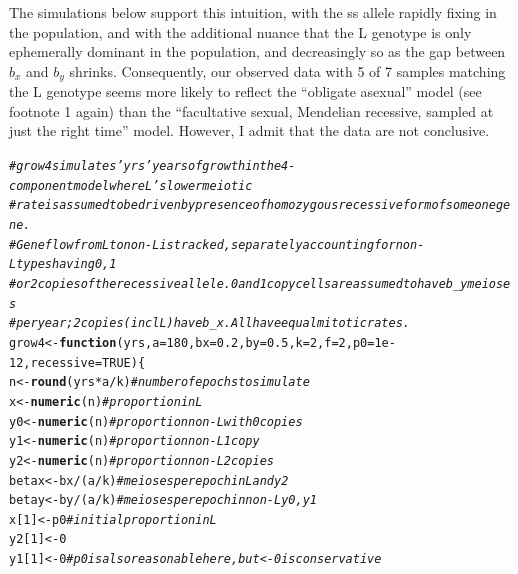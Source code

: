 \documentclass{article}\usepackage[]{graphicx}\usepackage[]{color}
\makeatletter
\newcommand{\hlnum}[1]{\textcolor[rgb]{0.686,0.059,0.569}{#1}}%
\newcommand{\hlcom}[1]{\textcolor[rgb]{0.678,0.584,0.686}{\textit{#1}}}%
\newcommand{\hlopt}[1]{\textcolor[rgb]{0,0,0}{#1}}%
\newcommand{\hlstd}[1]{\textcolor[rgb]{0.345,0.345,0.345}{#1}}%
\newcommand{\hlkwa}[1]{\textcolor[rgb]{0.161,0.373,0.58}{\textbf{#1}}}%
\newcommand{\hlkwb}[1]{\textcolor[rgb]{0.69,0.353,0.396}{#1}}%
\newcommand{\hlkwc}[1]{\textcolor[rgb]{0.333,0.667,0.333}{#1}}%
\newcommand{\hlkwd}[1]{\textcolor[rgb]{0.737,0.353,0.396}{\textbf{#1}}}%
\newenvironment{kframe}{%
 \def\at@end@of@kframe{}%
 \ifinner\ifhmode%
  \def\at@end@of@kframe{\end{minipage}}%
  \begin{minipage}{\columnwidth}%
 \fi\fi%
 \def\FrameCommand##1{\hskip\@totalleftmargin \hskip-\fboxsep
 \colorbox{shadecolor}{##1}\hskip-\fboxsep
     \hskip-\linewidth \hskip-\@totalleftmargin \hskip\columnwidth}%
 \MakeFramed {\advance\hsize-\width
   \@totalleftmargin\z@ \linewidth\hsize
   \@setminipage}}%
 {\par\unskip\endMakeFramed%
 \at@end@of@kframe}
\newenvironment{knitrout}{}{} %
\makeatother
\begin{document}
The simulations below support this intuition, with the ss allele rapidly fixing in the population,
and with the additional nuance that the L genotype is only ephemerally dominant in the population,
and decreasingly so as the gap between $b_x$ and $b_y$ shrinks.  Consequently, our observed data
with 5 of 7 samples matching the L genotype seems more likely to reflect the ``obligate asexual''
model (see footnote 1 again) than the ``facultative sexual, Mendelian recessive, sampled at just the
right time'' model.  However, I admit that the data are not conclusive.

\begin{knitrout}\footnotesize
{}\color{fgcolor}\begin{kframe}
\begin{alltt}
\hlcom{# grow4 simulates 'yrs' years of growth in the 4-component model where L's lower meiotic}
\hlcom{# rate is assumed to be driven by presence of homozygous recessive form of some one gene. }
\hlcom{# Gene flow from L to non-L is tracked, separately accounting for non-L types having 0, 1}
\hlcom{# or 2 copies of the recessive allele. 0 and 1 copy cells are assumed to have b_y meioses}
\hlcom{# per year; 2 copies (incl L) have b_x.  All have equal mitotic rates.}
\hlstd{grow4} \hlkwb{<-} \hlkwa{function}\hlstd{(}\hlkwc{yrs}\hlstd{,} \hlkwc{a}\hlstd{=}\hlnum{180}\hlstd{,} \hlkwc{bx}\hlstd{=}\hlnum{0.2}\hlstd{,} \hlkwc{by}\hlstd{=}\hlnum{0.5}\hlstd{,} \hlkwc{k}\hlstd{=}\hlnum{2}\hlstd{,} \hlkwc{f}\hlstd{=}\hlnum{2}\hlstd{,} \hlkwc{p0}\hlstd{=}\hlnum{1e-12}\hlstd{,} \hlkwc{recessive}\hlstd{=}\hlnum{TRUE}\hlstd{)\{}
  \hlstd{n} \hlkwb{<-} \hlkwd{round}\hlstd{(yrs}\hlopt{*}\hlstd{a}\hlopt{/}\hlstd{k)} \hlcom{# number of epochs to simulate}
  \hlstd{x} \hlkwb{<-} \hlkwd{numeric}\hlstd{(n)}     \hlcom{# proportion in L}
  \hlstd{y0}\hlkwb{<-} \hlkwd{numeric}\hlstd{(n)}     \hlcom{# proportion non-L with 0 copies}
  \hlstd{y1}\hlkwb{<-} \hlkwd{numeric}\hlstd{(n)}     \hlcom{# proportion non-L 1 copy}
  \hlstd{y2}\hlkwb{<-} \hlkwd{numeric}\hlstd{(n)}     \hlcom{# proportion non-L 2 copies}
  \hlstd{betax} \hlkwb{<-} \hlstd{bx}\hlopt{/}\hlstd{(a}\hlopt{/}\hlstd{k)}   \hlcom{# meioses per epoch in L and y2}
  \hlstd{betay} \hlkwb{<-} \hlstd{by}\hlopt{/}\hlstd{(a}\hlopt{/}\hlstd{k)}   \hlcom{# meioses per epoch in non-L y0, y1}
  \hlstd{x[}\hlnum{1}\hlstd{]}  \hlkwb{<-} \hlstd{p0}         \hlcom{# initial proportion in L }
  \hlstd{y2[}\hlnum{1}\hlstd{]} \hlkwb{<-} \hlnum{0}
  \hlstd{y1[}\hlnum{1}\hlstd{]} \hlkwb{<-} \hlnum{0}          \hlcom{# p0 is also reasonable here, but <- 0 is conservative}

\end{alltt}
\end{kframe}
\end{knitrout}
\end{document}

